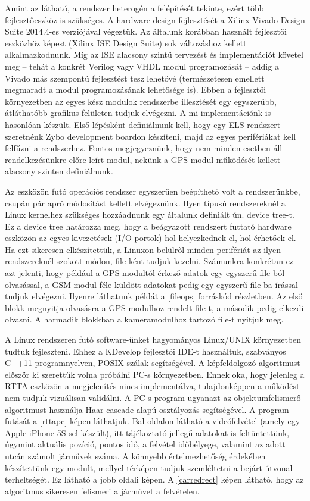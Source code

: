 \documentclass[a4paper,12pt]{report}
\begin{document}
Amint az látható, a rendszer heterogén a felépítését tekinte, ezért több fejlesztőeszköz is szükséges. A hardware design fejlesztését a Xilinx Vivado Design Suite 2014.4-es verziójával végeztük. Az általunk korábban használt fejlesztői eszközhöz képest (Xilinx ISE Design Suite) sok változáshoz kellett alkalmazkodnunk. Míg az ISE alacsony szintű tervezést és implementációt követel meg -- tehát a konkrét Verilog vagy VHDL modul programozását -- addig a Vivado más szempontú fejlesztést tesz lehetővé (természetesen emellett megmaradt a modul programozásának lehetősége is). Ebben a fejlesztői környezetben az egyes kész modulok rendszerbe illesztését egy egyszerűbb, átláthatóbb grafikus felületen tudjuk elvégezni. A mi implementációnk is hasonlóan készült. Első lépésként definiálnunk kell, hogy egy ELS rendszert szeretnénk Zybo development boardon készíteni, majd az egyes perifériákat kell felfűzni a rendszerhez. Fontos megjegyeznünk, hogy nem minden esetben áll rendelkezésünkre előre leírt modul, nekünk a GPS modul működését kellett alacsony szinten definiálnunk.

Az eszközön futó operációs rendszer egyszerűen beépíthető volt a rendszerünkbe, csupán pár apró módosítást kellett elvégeznünk. Ilyen típusú rendszereknél a Linux kernelhez szükséges hozzáadnunk egy általunk definiált ún. device tree-t. Ez a device tree határozza meg, hogy a beágyazott rendszert futtató hardware eszközön az egyes kivezetések (I/O portok) hol helyezkednek el, hol érhetőek el. Ha ezt sikeresen elkészítettük, a Linuxon belülről minden perifériát az ilyen rendszereknél szokott módon, file-ként tudjuk kezelni. Számunkra konkrétan ez azt jelenti, hogy például a GPS modultól érkező adatok egy egyszerű file-ból olvasással, a GSM modul féle küldött adatokat pedig egy egyszerű file-ba írással tudjuk elvégezni. Ilyenre láthatunk példát a \ref{fileops} forráskód részletben. Az első blokk megnyitja olvasásra a GPS modulhoz rendelt file-t, a második pedig elkezdi olvasni. A harmadik blokkban a kameramodulhoz tartozó file-t nyitjuk meg.



A Linux rendszeren futó software-ünket hagyományos Linux/UNIX környezetben tudtuk fejleszteni. Ehhez a KDevelop fejlesztői IDE-t használtuk, szabványos C++11 programnyelven, POSIX szálak segítségével. A képfeldolgozó algoritmust először ki szerettük volna próbálni PC-s környezetben. Ennek oka, hogy jelenleg a RTTA eszközön a megjelenítés nincs implementálva, tulajdonképpen a működést nem tudjuk vizuálisan validálni. A PC-s program ugyanazt az objektumfelismerő algoritmust használja Haar-cascade alapú osztályozás segítségével. A program futását a \ref{rttapc} képen láthatjuk. Bal oldalon látható a videófelvétel (amely egy Apple iPhone 5S-sel készült), itt tájékoztató jellegű adatokat is feltüntettünk, úgymint aktuális pozíció, pontos idő, a felvétel időbélyege, valamint az adott utcán számolt járművek száma. A könnyebb értelmezhetőség érdekében készítettünk egy modult, mellyel térképen tudjuk szemléltetni a bejárt útvonal terheltségét. Ez látható a jobb oldali képen. A \ref{carredrect} képen látható, hogy az algoritmus sikeresen felismeri a járművet a felvételen.
\end{document}
